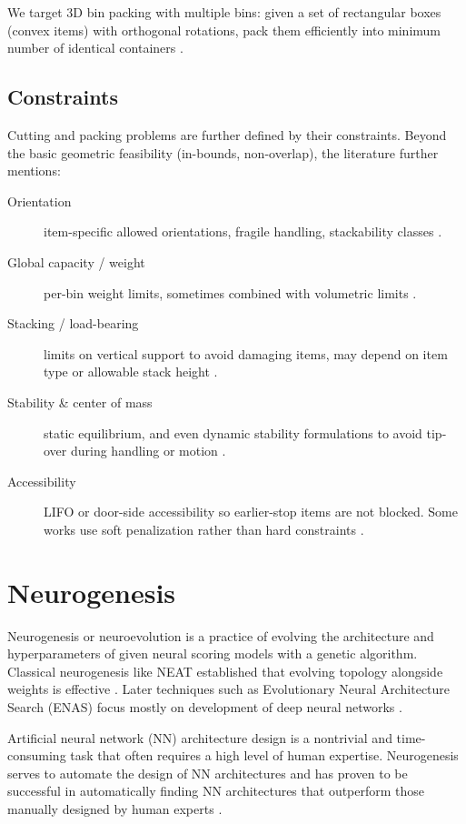 We target 3D bin packing with multiple bins: given a set of rectangular boxes (convex items) with orthogonal rotations, pack them efficiently into minimum number of identical containers \cite{WHS07}.

\subsection{Constraints}

Cutting and packing problems are further defined by their constraints. Beyond the basic geometric feasibility (in-bounds, non-overlap), the literature further mentions:

\begin{description}
    \item[Orientation] item-specific allowed orientations, fragile handling, stackability classes \cite{dNAJ21}.

    \item[Global capacity / weight] per-bin weight limits, sometimes combined with volumetric limits \cite{dNAJ21}.

    \item[Stacking / load-bearing] limits on vertical support to avoid damaging items, may depend on item type or allowable stack height \cite{GTMP22}.

    \item[Stability \& center of mass] static equilibrium, and even dynamic stability formulations to avoid tip-over during handling or motion \cite{GOGL16}.

    \item[Accessibility] LIFO or door-side accessibility so earlier-stop items are not blocked. Some works use soft penalization rather than hard constraints \cite{BTC23}.
\end{description}

\section{Neurogenesis}

Neurogenesis or neuroevolution is a practice of evolving the architecture and hyperparameters of given neural scoring models with a genetic algorithm. Classical neurogenesis like NEAT established that evolving topology alongside weights is effective \cite{LSX+20}. Later techniques such as Evolutionary Neural Architecture Search (ENAS) focus mostly on development of deep neural networks \cite{RMS+17}.

Artificial neural network (NN) architecture design is a nontrivial and time-consuming task that often requires a high level of human expertise. Neurogenesis serves to automate the design of NN architectures and has proven to be successful in automatically finding NN architectures that outperform those manually designed by human experts \cite{BB24}.

